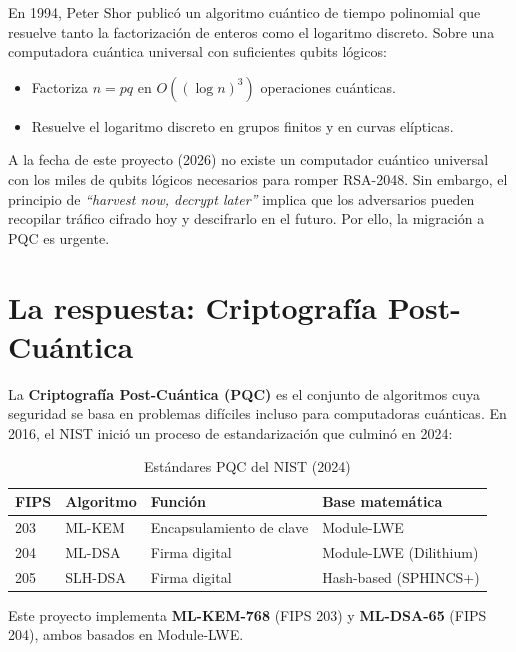 \documentclass[12pt,a4paper,twoside,openright]{book}
\theoremstyle{plain}
\theoremstyle{definition}
\theoremstyle{remark}
\begin{document}
En 1994, Peter Shor public\'o un algoritmo cu\'antico de tiempo polinomial
que resuelve tanto la factorizaci\'on de enteros como el logaritmo discreto.
Sobre una computadora cu\'antica universal con suficientes qubits l\'ogicos:

\begin{itemize}
  \item Factoriza $n = pq$ en $O((\log n)^3)$ operaciones cu\'anticas.
  \item Resuelve el logaritmo discreto en grupos finitos y en curvas el\'ipticas.
\end{itemize}

\begin{minota}
  A la fecha de este proyecto (2026) no existe un computador cu\'antico
  universal con los miles de qubits l\'ogicos necesarios para romper RSA-2048.
  Sin embargo, el principio de \emph{``harvest now, decrypt later''} implica
  que los adversarios pueden recopilar tr\'afico cifrado hoy y descifrarlo
  en el futuro. Por ello, la migraci\'on a PQC es urgente.
\end{minota}

\section{La respuesta: Criptograf\'ia Post-Cu\'antica}

La \textbf{Criptograf\'ia Post-Cu\'antica (PQC)} es el conjunto de algoritmos
cuya seguridad se basa en problemas dif\'iciles incluso para computadoras
cu\'anticas. En 2016, el NIST inici\'o un proceso de estandarizaci\'on que
culmin\'o en 2024:

\begin{table}[H]
\centering
\caption{Est\'andares PQC del NIST (2024)}
\label{tab:nist_standards}
\begin{tabular}{llll}
\toprule
\textbf{FIPS} & \textbf{Algoritmo} & \textbf{Funci\'on} & \textbf{Base matem\'atica} \\
\midrule
203 & ML-KEM & Encapsulamiento de clave & Module-LWE \\
204 & ML-DSA & Firma digital & Module-LWE (Dilithium) \\
205 & SLH-DSA & Firma digital & Hash-based (SPHINCS+) \\
\bottomrule
\end{tabular}
\end{table}

Este proyecto implementa \textbf{ML-KEM-768} (FIPS 203) y
\textbf{ML-DSA-65} (FIPS 204), ambos basados en Module-LWE.
\end{document}
